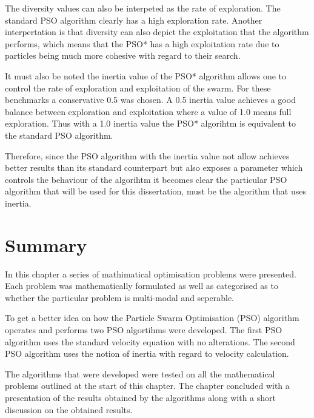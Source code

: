 The diversity values can also be interpeted as the rate of exploration. The standard PSO algorithm clearly has a high exploration rate. Another interpertation is that diversity can also depict the exploitation that the algorithm performs, which means that the PSO* has a high exploitation rate due to particles being much more cohesive with regard to their search.

It must also be noted the inertia value of the PSO* algorithm allows one to control the rate of exploration and exploitation of the swarm. For these benchmarks a conservative 0.5 was chosen. A 0.5 inertia value achieves a good balance between exploration and exploitation where a value of 1.0 means full exploration. Thus with a 1.0 inertia value the PSO* algorihtm is equivalent to the standard PSO algorithm.

Therefore, since the PSO algorithm with the inertia value not allow achieves better results than its standard counterpart but also exposes a parameter which controls the behaviour of the algorihtm it becomes clear the particular PSO algorithm that will be used for this dissertation, must be the algorithm that uses inertia.
\section{Summary}
In this chapter a series of mathimatical optimisation problems were presented. Each problem was mathematically formulated as well as categorised as to whether the particular problem is multi-modal and seperable.

To get a better idea on how the Particle Swarm Optimisation (PSO) algorithm operates and performs two PSO algortihms were developed. The first PSO algorithm uses the standard velocity equation with no alterations. The second PSO algorithm uses the notion of inertia with regard to velocity calculation.

The algorithms that were developed were tested on all the mathematical problems outlined at the start of this chapter. The chapter concluded with a presentation of the results obtained by the algorithms along with a short discussion on the obtained results.
